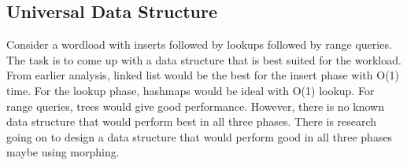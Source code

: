 \subsection{Universal Data Structure}
Consider a wordload with inserts followed by lookups followed by range queries. The task is to come up with a data structure that is best suited for the workload. From earlier analysis, linked list would be the best for the insert phase with O(1) time. For the lookup phase, hashmaps would be ideal with O(1) lookup. For range queries, trees would give good performance. However, there is no known data structure that would perform best in all three phases. There is research going on to design a data structure that would perform good in all three phases maybe using morphing.